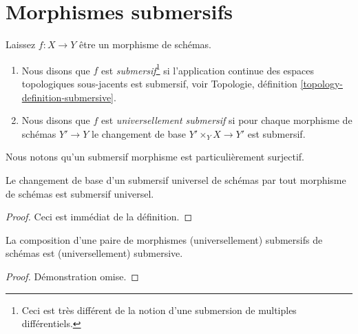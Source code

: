 \section{Morphismes submersifs}
\label{section-submersive}

\begin{definition}

\label{definition-submersive}
Laissez $f : X \to Y$ être un morphisme de schémas.
\begin{enumerate}
\item Nous disons que $f$ est {\it submersif}\footnote{Ceci est très différent de la notion d'une submersion de multiples différentiels.} si l'application continue des espaces topologiques sous-jacents est submersif, voir Topologie, définition \ref{topology-definition-submersive}.
\item Nous disons que $f$ est {\it universellement submersif} si pour chaque morphisme de schémas $Y' \to Y$ le changement de base $Y' \times_Y X \to Y'$ est submersif.
\end{enumerate}

\end{definition}

\noindent
Nous notons qu'un submersif morphisme est particulièrement surjectif.

\begin{lemma}

\label{lemma-base-change-universally-submersive}

Le changement de base d'un submersif universel de schémas par tout morphisme de schémas est submersif universel.

\end{lemma}

\begin{proof}
Ceci est immédiat de la définition.
\end{proof}

\begin{lemma}

\label{lemma-composition-universally-submersive}
La composition d'une paire de morphismes (universellement) submersifs de schémas est (universellement) submersive.
\end{lemma}

\begin{proof}
Démonstration omise.
\end{proof}










